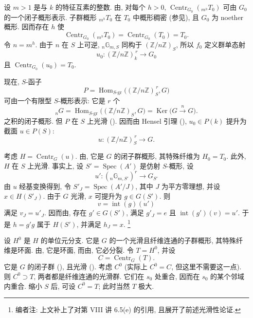 设 \(m>1\) 是与 \(k\) 的特征互素的整数. 由, 对每个 \(h>0\), \(\operatorname{Centr}_{G_0}({}_{m^h}T_0)\) 可由 \(G_0\) 的一个闭子概形表示. 子群概形 \({}_{m^h}T_0\) 在 \(T_0\) 中概形稠密 \textup{(参见)}, 且 \(G_0\) 为 noether 概形. 因而存在 \(h\) 使
\[
  \operatorname{Centr}_{G_0}({}_{m^h}T_0)
  =
  \operatorname{Centr}_{G_0}(T_0)
  =
  T_0.
\]
令 \(n=m^h\). 由于 \(n\) 在 \(S\) 上可逆, \({}_n\mathbb G_{m,S}\) 同构于 \((\mathbb Z/n\mathbb Z)_S\), 所以 \(f_0\) 定义群单态射
\[
  u_0\colon(\mathbb Z/n\mathbb Z)_k^{\,r}\longrightarrow G_0
\]
且 \(\operatorname{Centr}_{G_0}(u_0)=T_0\).

现在, \(S\)-函子
\[
  P=
  \operatorname{Hom}_{S\text{-}\mathrm{gr}}
  \bigl((\mathbb Z/n\mathbb Z)_S^{\,r},G\bigr)
\]
可由一个有限型 \(S\)-概形表示: 它是 \(r\) 个
\[
  {}_nG
  =
  \operatorname{Hom}_{S\text{-}\mathrm{gr}}
  \bigl((\mathbb Z/n\mathbb Z)_S,G\bigr)
  =
  \operatorname{Ker}\bigl(G\xrightarrow{\,n\,}G\bigr).
\]
之积的闭子概形. 但 \(P\) 在 \(S\) 上光滑 \textup{()}. 因而由 Hensel 引理 \textup{()}, \(u_0\in P(k)\) 提升为截面 \(u\in P(S)\):
\[
  u\colon(\mathbb Z/n\mathbb Z)_S^{\,r}\longrightarrow G.
\]

考虑 \(H=\operatorname{Centr}_G(u)\). 由, 它是 \(G\) 的闭子群概形, 其特殊纤维为 \(H_0=T_0\). 此外, \(H\) 在 \(S\) 上光滑. 事实上, 设 \(S'=\operatorname{Spec}(A')\) 是仿射 \(S\)-概形, 设
\[
  u'\colon({}_n\mathbb G_{m,S'})^r\longrightarrow G_{S'}
\]
由 \(u\) 经基变换得到, 令 \(S'_J=\operatorname{Spec}(A'/J)\), 其中 \(J\) 为平方零理想, 并设 \(x\in H(S'_J)\). 由于 \(G\) 光滑, \(x\) 可提升为 \(g\in G(S')\). 则
\[
  v=\operatorname{int}(g)(u')
\]
满足 \(v_J=u'_J\). 因而由, 存在 \(g'\in G(S')\), 满足 \(g'_J=e\) 且 \(\operatorname{int}(g')(v)=u'\). 于是 \(h=g'g\) 属于 \(H(S')\), 并满足 \(h_J=x\).
\footnote{编者注: 上文补上了对第 VIII 讲 6.5(e) 的引用, 且展开了前述光滑性论证.}

设 \(H^0\) 是 \(H\) 的单位元分支. 它是 \(G\) 的一个光滑且纤维连通的子群概形, 其特殊纤维是环面. 由, 它是环面, 而由, 它必分裂. 令 \(T=H^0\), 并设
\[
  C=\operatorname{Centr}_G(T).
\]
它是 \(G\) 的闭子群 \textup{()}, 且光滑 \textup{()}. 考虑 \(C^0\) \textup{(实际上 \(C^0=C\), 但这里不需要这一点)}. 则 \(C^0\supset T\), 两者都是纤维连通的光滑群. 它们在 \(s_0\) 处重合, 因而在 \(s_0\) 的某个邻域内重合. 缩小 \(S\) 后, 可设 \(C^0=T\); 此时当然 \(T\) 极大.

